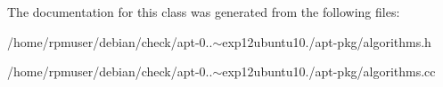 \-The documentation for this class was generated from the following files\-:\begin{DoxyCompactItemize}
\item 
/home/rpmuser/debian/check/apt-\/0..$\sim$exp12ubuntu10./apt-\/pkg/algorithms.\-h\item 
/home/rpmuser/debian/check/apt-\/0..$\sim$exp12ubuntu10./apt-\/pkg/algorithms.\-cc\end{DoxyCompactItemize}
